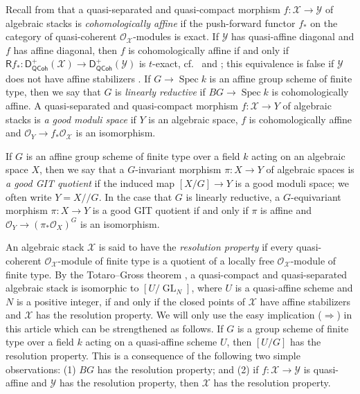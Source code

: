 \documentclass[a4paper]{amsart}
\theoremstyle{plain}
\theoremstyle{definition}
\theoremstyle{remark}
\numberwithin{equation}{section}
\newcommand\cX{\mathcal{X}}
\newcommand\cY{\mathcal{Y}}
\newcommand\oh{\mathcal{O}}
\newcommand\co{\colon}
\DeclareMathOperator{\Spec}{Spec}
\DeclareMathOperator{\GL}{GL}
\newcommand{\gitq}{/\!\!/}
\newcommand{\QCoh}{\mathsf{QCoh}}
\newcommand{\DCAT}{\mathsf{D}}
\newcommand{\DQCOH}{\DCAT_{\QCoh}}
\newcommand{\DERF}[1]{\mathsf{{#1}}}
\newcommand{\RDERF}{\DERF{R}}
\begin{document}
Recall from \cite{alper-good} that a quasi-separated and quasi-compact morphism $f \co \cX \to \cY$ of algebraic stacks is {\it cohomologically affine} if the push-forward functor $f_*$ on the category of quasi-coherent $\oh_{\cX}$-modules is exact.
If $\cY$ has quasi-affine diagonal and $f$ has affine diagonal, then $f$ is cohomologically affine if and only if $\RDERF f_* \colon \DQCOH^+(\cX) \to \DQCOH^+(\cY)$ is $t$-exact, cf.\ \cite[Prop.~3.10~(vii)]{alper-good} and \cite[Prop.~2.1]{hallj_neeman_dary_no_compacts}; this equivalence is false if $\cY$ does not have affine stabilizers \cite[Rem.~1.6]{hallj_dary_alg_groups_classifying}.
If $G \to \Spec k$ is an affine group scheme of finite type, then we say that $G$ is {\it linearly reductive} if $BG \to \Spec k$ is cohomologically affine.
A quasi-separated and quasi-compact morphism $f \co \cX \to Y$ of algebraic stacks is {\it a good moduli space} if $Y$ is an algebraic space, $f$ is cohomologically affine and $\oh_Y \to f_* \oh_{\cX}$ is an isomorphism.  

If $G$ is an affine group scheme of finite type over a field $k$ acting on an algebraic space $X$, then we say that a $G$-invariant morphism $\pi \co X \to Y$ of algebraic spaces is {\it a good GIT quotient} if the induced map $[X/G] \to Y$ is a good moduli space; we often write $Y = X \gitq G$.  In the case that $G$ is linearly reductive, a $G$-equivariant morphism $\pi \co X \to Y$ is a good GIT quotient if and only if $\pi$ is affine and $\oh_Y \to (\pi_* \oh_X)^G$ is an isomorphism.

An algebraic stack $\cX$ is said to have the {\it resolution property}
if every quasi-coherent $\oh_{\cX}$-module of finite type is a
quotient of a locally free $\oh_{\cX}$-module of finite type.
By the Totaro--Gross
theorem \cite{totaro,gross-resolution}, a quasi-compact and
quasi-separated algebraic stack is isomorphic to $[U/\GL_N]$, where
$U$ is a quasi-affine scheme and $N$ is a positive integer, if and
only if the closed points of $\cX$ have affine stabilizers and $\cX$
has the resolution property.
We will only use the easy implication ($\Longrightarrow$) in this article which can
be strengthened as follows. If $G$ is a group scheme of finite type over a
field $k$ acting on a quasi-affine scheme $U$, then $[U/G]$ has the resolution
property. This is a
consequence of the following two simple observations: (1) $BG$ has
the resolution property; and (2) if $f \colon \cX \to \cY$ is
quasi-affine and $\cY$ has the resolution property, then $\cX$ has the
resolution property. 
\end{document}
